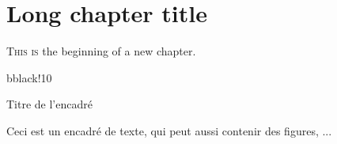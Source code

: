 \chapter[Short chapter title]{Long chapter title\label{c:chapname}}

\thispagestyle{empty}\noindent\lettrine{T}{his is} the beginning of a new chapter.

\begin{boxenv}{b}{black!10}{\textwidth}
\caption{Titre de l'encadré}
Ceci est un encadré de texte, qui peut aussi contenir des figures, ...
\label{b:box}
\end{boxenv}